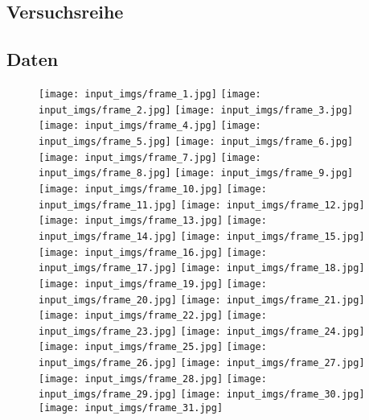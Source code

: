 \documentclass{paper}
\begin{document}
	\begin{appendix}
		\section{Versuchsreihe}
			\subsection{Daten}
				\begin{figure}
					\texttt{[image: input\_imgs/frame\_1.jpg]}
					\texttt{[image: input\_imgs/frame\_2.jpg]}
					\texttt{[image: input\_imgs/frame\_3.jpg]}
					\texttt{[image: input\_imgs/frame\_4.jpg]}
					\texttt{[image: input\_imgs/frame\_5.jpg]}					
					\texttt{[image: input\_imgs/frame\_6.jpg]}
					\texttt{[image: input\_imgs/frame\_7.jpg]}
					\texttt{[image: input\_imgs/frame\_8.jpg]}
					\texttt{[image: input\_imgs/frame\_9.jpg]}
					\texttt{[image: input\_imgs/frame\_10.jpg]}
					\texttt{[image: input\_imgs/frame\_11.jpg]}
					\texttt{[image: input\_imgs/frame\_12.jpg]}
					\texttt{[image: input\_imgs/frame\_13.jpg]}
					\texttt{[image: input\_imgs/frame\_14.jpg]}
					\texttt{[image: input\_imgs/frame\_15.jpg]}
					\texttt{[image: input\_imgs/frame\_16.jpg]}
					\texttt{[image: input\_imgs/frame\_17.jpg]}
					\texttt{[image: input\_imgs/frame\_18.jpg]}
					\texttt{[image: input\_imgs/frame\_19.jpg]}
					\texttt{[image: input\_imgs/frame\_20.jpg]}	
					\texttt{[image: input\_imgs/frame\_21.jpg]}
					\texttt{[image: input\_imgs/frame\_22.jpg]}
					\texttt{[image: input\_imgs/frame\_23.jpg]}
					\texttt{[image: input\_imgs/frame\_24.jpg]}
					\texttt{[image: input\_imgs/frame\_25.jpg]}					
					\texttt{[image: input\_imgs/frame\_26.jpg]}
					\texttt{[image: input\_imgs/frame\_27.jpg]}
					\texttt{[image: input\_imgs/frame\_28.jpg]}
					\texttt{[image: input\_imgs/frame\_29.jpg]}
					\texttt{[image: input\_imgs/frame\_30.jpg]}
					\texttt{[image: input\_imgs/frame\_31.jpg]}

\end{figure}
\end{appendix}
\end{document}
